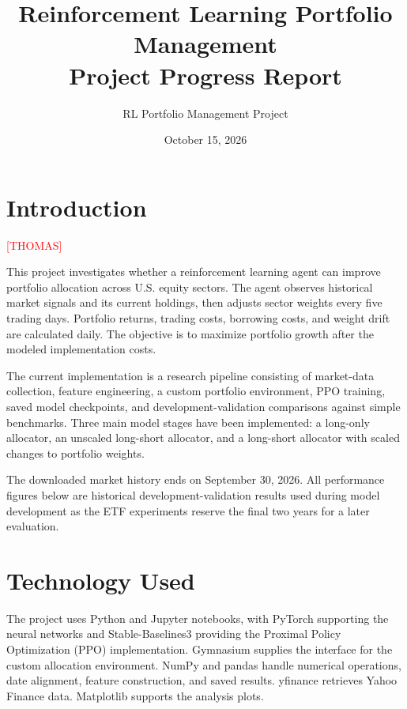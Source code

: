 \documentclass[11pt,letterpaper]{article}
\title{Reinforcement Learning Portfolio Management\\[4pt]
  \large Project Progress Report}
\author{RL Portfolio Management Project}
\date{October 15, 2026}
\begin{document}
\maketitle

\section{Introduction}

\textcolor{red}{[THOMAS]}


This project investigates whether a reinforcement learning agent can improve
portfolio allocation across U.S. equity sectors. The agent observes historical
market signals and its current holdings, then adjusts sector weights every five
trading days. Portfolio returns, trading costs, borrowing costs, and weight drift
are calculated daily. The objective is to maximize portfolio growth after the
modeled implementation costs.

The current implementation is a research pipeline consisting of market-data collection,
feature engineering, a custom portfolio environment, PPO training, saved model
checkpoints, and development-validation comparisons against simple benchmarks.
Three main model stages have been implemented: a long-only allocator, an unscaled
long-short allocator, and a long-short allocator with scaled changes to portfolio
weights.

The downloaded market history ends on September
30, 2026. All performance figures below are historical development-validation
results used during model development as the ETF experiments reserve the
final two years for a later evaluation.

\section{Technology Used}

The project uses Python and Jupyter notebooks, with PyTorch supporting the neural
networks and Stable-Baselines3 providing the Proximal Policy Optimization (PPO)
implementation. Gymnasium supplies the interface for the custom allocation
environment. NumPy and pandas handle numerical operations, date alignment,
feature construction, and saved results. yfinance retrieves Yahoo Finance data.
Matplotlib supports the analysis plots.
\end{document}
